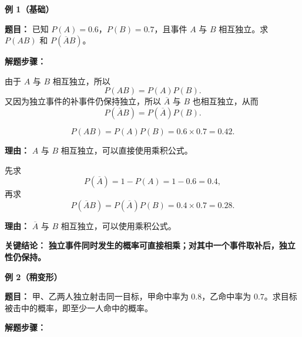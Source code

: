 \begin{examplebox}

\textbf{\textcolor{CExample}{例 1（基础）}}

\textbf{\textcolor{CExample}{题目：}}
已知 $P(A)=0.6$，$P(B)=0.7$，且事件 $A$ 与 $B$ 相互独立。求 $P(AB)$ 和 $P(\overline{A}B)$。

\textbf{\textcolor{CExample}{解题步骤：}}

\begin{description}[style=nextline, leftmargin=2.8em, labelsep=0.5em, itemsep=0.45em]

    \item[\textbf{第一步（识别独立性）：}]
    由于 $A$ 与 $B$ 相互独立，所以
    \[
        P(AB)=P(A)P(B).
    \]
    又因为独立事件的补事件仍保持独立，所以 $\overline{A}$ 与 $B$ 也相互独立，从而
    \[
        P(\overline{A}B)=P(\overline{A})P(B).
    \]

    \item[\textbf{第二步（计算 $P(AB)$）：}]
    \[
        P(AB)
        =
        P(A)P(B)
        =
        0.6\times 0.7
        =
        0.42.
    \]

    \par\textbf{理由：}
    $A$ 与 $B$ 相互独立，可以直接使用乘积公式。

    \item[\textbf{第三步（计算 $P(\overline{A}B)$）：}]
    先求
    \[
        P(\overline{A})=1-P(A)=1-0.6=0.4,
    \]
    再求
    \[
        P(\overline{A}B)
        =
        P(\overline{A})P(B)
        =
        0.4\times 0.7
        =
        0.28.
    \]

    \par\textbf{理由：}
    $\overline{A}$ 与 $B$ 相互独立，可以使用乘积公式。

\end{description}

\textbf{\textcolor{CExample}{关键结论：}}
\textbf{独立事件同时发生的概率可直接相乘；对其中一个事件取补后，独立性仍保持。}

\medskip

\textbf{\textcolor{CExample}{例 2（稍变形）}}

\textbf{\textcolor{CExample}{题目：}}
甲、乙两人独立射击同一目标，甲命中率为 $0.8$，乙命中率为 $0.7$。求目标被击中的概率，即至少一人命中的概率。

\textbf{\textcolor{CExample}{解题步骤：}}

\begin{description}[style=nextline, leftmargin=2.8em, labelsep=0.5em, itemsep=0.45em]


\end{description}
\end{examplebox}
